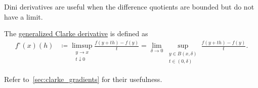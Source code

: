 \begin{definition}
\begin{defenum}
    Dini derivatives are useful when the difference quotients are bounded but do not have a limit.

    \item\label{def:derivatives/clarke}\cite[Section 10.1]{Clarke2013} The \ul{generalized Clarke derivative} is defined as
    \begin{align*}
      f^\circ(x)(h)
      &\coloneqq
      \limsup_{\substack{y \to x \\ t \downarrow 0}} \frac {f(y + th) - f(y)} t
      =
      \lim_{\delta \to 0} \sup_{\substack{y \in B(x, \delta) \\ t \in (0, \delta)}} \frac {f(y + th) - f(y)} t.
    \end{align*}

    Refer to~\cref{sec:clarke_gradients} for their usefulness.
  \end{defenum}
\end{definition}

